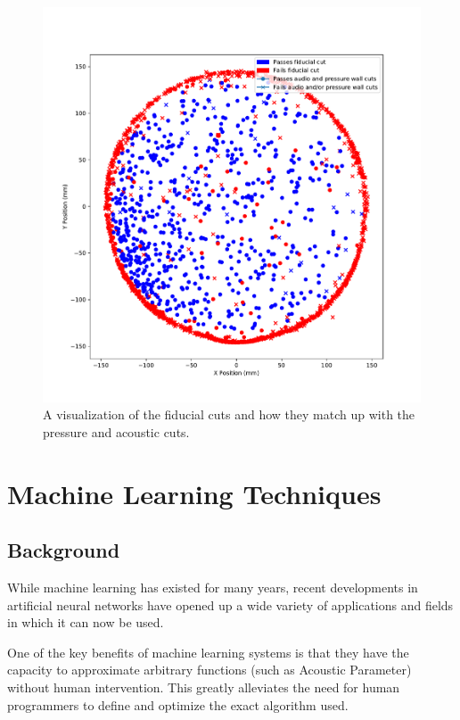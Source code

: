 \documentclass[10pt]{article}
\begin{document}
\begin{figure}[h!]
    \centering
    \includegraphics[width=\textwidth]{wall_event_positions}
    \caption{\label{} A visualization of the fiducial cuts and how they match up with the pressure and acoustic cuts.}
\end{figure}

\section{Machine Learning Techniques}

\subsection{Background}

While machine learning has existed for many years, recent developments in artificial neural networks have opened up a wide variety of applications and fields in which it can now be used.

One of the key benefits of machine learning systems is that they have the capacity to approximate arbitrary functions (such as Acoustic Parameter) without human intervention. This greatly alleviates the need for human programmers to define and optimize the exact algorithm used.
\end{document}
